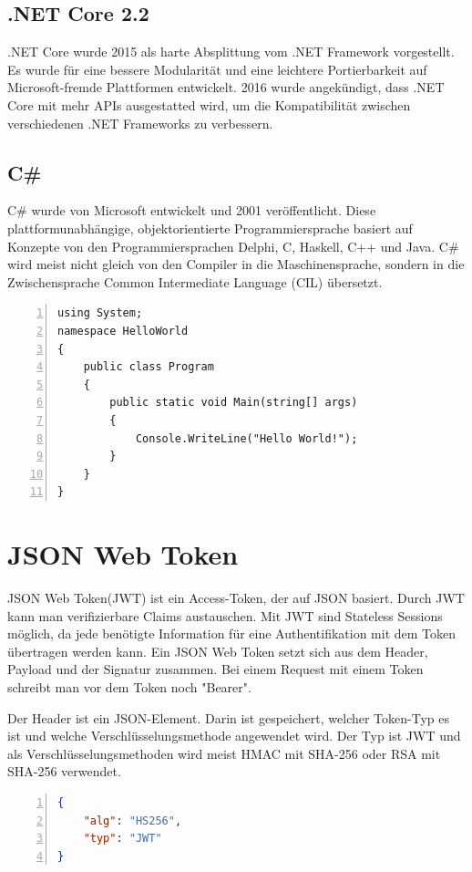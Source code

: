 \subsection{.NET Core 2.2}
.NET Core wurde 2015 als harte Absplittung vom .NET Framework vorgestellt. Es wurde für eine bessere Modularität und eine leichtere Portierbarkeit auf Microsoft-fremde Plattformen entwickelt. 2016 wurde angekündigt, dass .NET Core mit mehr APIs ausgestatted wird, um die Kompatibilität zwischen verschiedenen .NET Frameworks zu verbessern. \autocite{wikiDotnet}

\subsection{C\#}
C\# wurde von Microsoft entwickelt und 2001 veröffentlicht. Diese plattformunabhängige, objektorientierte Programmiersprache basiert auf Konzepte von den Programmiersprachen Delphi, C, Haskell, C++ und Java.
C\# wird meist nicht gleich von den Compiler in die Maschinensprache, sondern in die Zwischensprache Common Intermediate Language (CIL) übersetzt. \autocite{wikiCSharp}

\begin{lstlisting}[caption={C\#-Syntaxbeispiel},captionpos=b, numbers=left, backgroundcolor=\color{black!10}, language={[Sharp]C}]
using System;
namespace HelloWorld
{
	public class Program
	{
		public static void Main(string[] args)
		{
			Console.WriteLine("Hello World!");
		}
	}
}
\end{lstlisting}

\section{JSON Web Token}
JSON Web Token(JWT) ist ein Access-Token, der auf JSON basiert. Durch JWT kann man verifizierbare Claims austauschen. Mit JWT sind Stateless Sessions möglich, da jede benötigte Information für eine Authentifikation mit dem Token übertragen werden kann. Ein JSON Web Token setzt sich aus dem Header, Payload und der Signatur zusammen. Bei einem Request mit einem Token schreibt man vor dem Token noch "Bearer". \autocite{wikiJWT}

Der Header ist ein JSON-Element. Darin ist gespeichert, welcher Token-Typ es ist und welche Verschlüsselungsmethode angewendet wird. Der Typ ist JWT und als Verschlüsselungsmethoden wird meist HMAC mit SHA-256 oder RSA mit SHA-256 verwendet. \autocite{wikiJWT} \\
\begin{lstlisting}[caption={JWT-Header Beispiel},captionpos=b, numbers=left, backgroundcolor=\color{black!10}, language=json]
{
	"alg": "HS256",
	"typ": "JWT"
}
\end{lstlisting}

